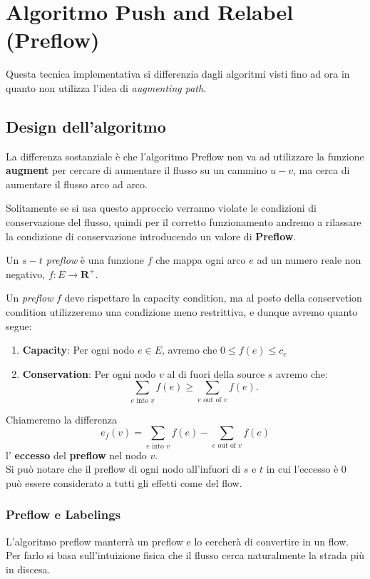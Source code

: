 \chapter{Algoritmo Push and Relabel (Preflow)}

Questa tecnica implementativa si differenzia dagli algoritmi visti fino ad ora in
quanto non utilizza l'idea di \textit{augmenting path}.

\section{Design dell'algoritmo}

La differenza sostanziale è che l'algoritmo Preflow non va ad utilizzare la
funzione \textbf{augment} per cercare di aumentare il flusso su un cammino $u -
	v$, ma cerca di aumentare il flusso arco ad arco.

Solitamente se si usa questo approccio verranno violate le condizioni di
conservazione del flusso, quindi per il corretto funzionamento andremo a
rilassare la condizione di conservazione introducendo un valore di
\textbf{Preflow}.

\begin{myblockquote}
	Un \textit{$s-t$ preflow } è una funzione $f$ che mappa ogni arco $e$ ad un
	numero reale non negativo, $f: E \rightarrow \mathbf{R^+}$.
\end{myblockquote}

Un \textit{preflow} $f$ deve rispettare la capacity condition, ma al posto della
conservetion condition utilizzeremo una condizione meno restrittiva, e dunque
avremo quanto segue:
\begin{enumerate}
	\item \textbf{Capacity}: Per ogni nodo $e \in E$, avremo che $0 \le f(e) \le
		      c_e$
	\item \textbf{Conservation}: Per ogni nodo $v$ al di fuori della source $s$
	      avremo che:
	      $$
		      \sum_{e \text{ into }v}f(e) \ge \sum_{e \text{ out of }v}f(e).
	      $$
\end{enumerate}

Chiameremo la differenza
$$
	e_f(v) = \sum_{e \text{ into }v}f(e) - \sum_{e \text{ out of }v}f(e)
$$
l' \textbf{eccesso} del \textbf{preflow} nel nodo $v$.\\

Si può notare che il preflow di ogni nodo all'infuori di $s$ e $t$ in cui
l'eccesso è 0 può essere considerato a tutti gli effetti come del flow.

\subsection{Preflow e Labelings}
L'algoritmo preflow manterrà un preflow e lo cercherà di convertire in un flow.
Per farlo si basa sull'intuizione fisica che il flusso cerca naturalmente la
strada più in discesa.

